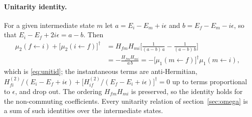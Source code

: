 \documentclass[11pt,a4paper]{article}
\numberwithin{equation}{section}
\newcommand{\dg}{\dagger}
\begin{document}
\paragraph{Unitarity identity.} For a given intermediate state $m$ let $a=E_{i}-E_{m}+i\epsilon$ and
$b=E_{f}-E_{m}-i\epsilon$, so that $E_{i}-E_{f}+2i\epsilon=a-b$. Then
\begin{align}
\mu_{2}(f\leftarrow i)+\big[\mu_{2}(i\leftarrow f)\big]^{\dg}
&=H_{fm}H_{mi}\Big[\frac{1}{(a-b)\,a}-\frac{1}{(a-b)\,b}\Big]
\nonumber\\
&=-\frac{H_{fm}H_{mi}}{a\,b}
=-\big[\mu_{1}(m\leftarrow f)\big]^{\dg}\mu_{1}(m\leftarrow i),
\end{align}
which is \eqref{eq:unitid}; the instantaneous terms are anti-Hermitian,
$H^{(2)}_{fi}/(E_{i}-E_{f}+i\epsilon)+\big[H^{(2)}_{if}/(E_{f}-E_{i}+i\epsilon)\big]^{\dg}=0$ up to terms
proportional to $\epsilon$, and drop out. The ordering $H_{fm}H_{mi}$ is preserved, so the identity
holds for the non-commuting coefficients. Every unitarity relation of section~\ref{sec:omega}
is a sum of such identities over the intermediate states.
\end{document}
